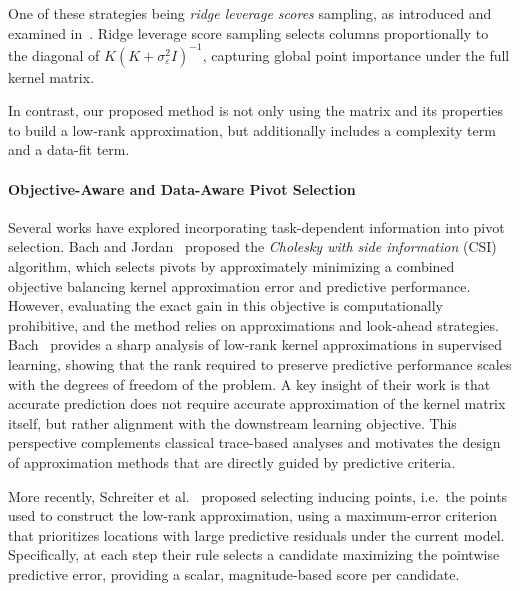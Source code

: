 \documentclass[onefignum,onetabnum]{siamart250211}
\begin{document}
One of these strategies being \emph{ridge leverage scores} sampling, as introduced and examined in~\cite{alaoui.2015, musco.2017}. Ridge leverage score sampling selects columns proportionally to the diagonal of $K(K + \sigma_\varepsilon^2 I)^{-1}$, capturing global point importance under the full kernel matrix. 

In contrast, our proposed method is not only using the matrix and its properties to build a low-rank approximation, but additionally includes a complexity term and a data-fit term. 


\paragraph{Objective-Aware and Data-Aware Pivot Selection}
Several works have explored incorporating task-dependent information into pivot selection. Bach and Jordan~\cite{bach.2005} proposed the \emph{Cholesky with side information} (CSI) algorithm, which selects pivots by approximately minimizing a combined objective balancing kernel approximation error and predictive performance. However, evaluating the exact gain in this objective is computationally prohibitive, and the method relies on approximations and look-ahead strategies. Bach~\cite{bach.2013} provides a sharp analysis of low-rank kernel approximations in supervised learning, showing that the rank required to preserve predictive performance scales with the degrees of freedom of the problem. A key insight of their work is that accurate prediction does not require accurate approximation of the kernel matrix itself, but rather alignment with the downstream learning objective. This perspective complements classical trace-based analyses and motivates the design of approximation methods that are directly guided by predictive criteria.

More recently, Schreiter et al.~\cite{schreiter.2016} proposed selecting inducing points, i.e.~the points used to construct the low-rank approximation, using a maximum-error criterion that prioritizes locations with large predictive residuals under the current model. Specifically, at each step their rule selects a candidate maximizing the pointwise predictive error, providing a scalar, magnitude-based score per candidate. 
\end{document}
